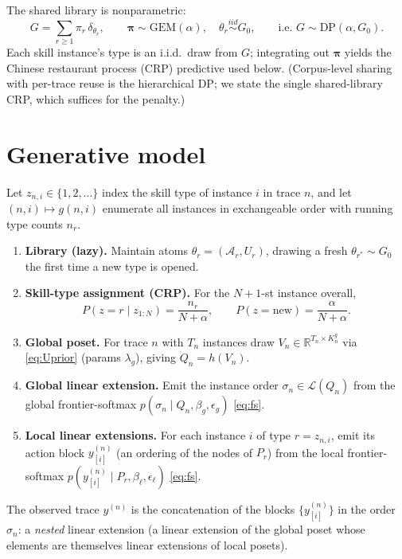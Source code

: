\documentclass[11pt]{article}
\newcommand{\R}{\mathbb{R}}
\newcommand{\sA}{\mathcal{A}}
\newcommand{\sL}{\mathcal{L}}
\newcommand{\GEM}{\mathrm{GEM}}
\newcommand{\DP}{\mathrm{DP}}
\begin{document}
The shared library is nonparametric:
\begin{equation}
G=\sum_{r\ge1}\pi_r\,\delta_{\theta_r},\qquad
\bm\pi\sim\GEM(\alpha),\quad \theta_r\stackrel{iid}{\sim}G_0,\qquad\text{i.e. } G\sim\DP(\alpha,G_0).
\label{eq:DP}
\end{equation}
Each skill instance's type is an i.i.d.\ draw from $G$; integrating out $\bm\pi$ yields the Chinese
restaurant process (CRP) predictive used below. (Corpus-level sharing with per-trace reuse is the
hierarchical DP; we state the single shared-library CRP, which suffices for the penalty.)

\section{Generative model}
Let $z_{n,i}\in\{1,2,\dots\}$ index the skill type of instance $i$ in trace $n$, and let
$(n,i)\mapsto g(n,i)$ enumerate all instances in exchangeable order with running type counts $n_r$.
\begin{enumerate}
\item \textbf{Library (lazy).} Maintain atoms $\theta_r=(\sA_r,U_r)$, drawing a fresh
$\theta_{r^*}\sim G_0$ the first time a new type is opened.
\item \textbf{Skill-type assignment (CRP).} For the $N{+}1$-st instance overall,
\begin{equation}
P(z=r\mid z_{1:N})=\frac{n_r}{N+\alpha},\qquad
P(z=\text{new})=\frac{\alpha}{N+\alpha}.
\label{eq:crp}
\end{equation}
\item \textbf{Global poset.} For trace $n$ with $T_n$ instances draw $V_n\in\R^{T_n\times K^g_n}$ via
\eqref{eq:Uprior} (params $\lambda_g$), giving $Q_n=h(V_n)$.
\item \textbf{Global linear extension.} Emit the instance order $\sigma_n\in\sL(Q_n)$ from the global
frontier-softmax $p(\sigma_n\mid Q_n,\beta_g,\epsilon_g)$ \eqref{eq:fs}.
\item \textbf{Local linear extensions.} For each instance $i$ of type $r=z_{n,i}$, emit its action block
$y^{(n)}_{[i]}$ (an ordering of the nodes of $P_r$) from the local frontier-softmax
$p(y^{(n)}_{[i]}\mid P_r,\beta_\ell,\epsilon_\ell)$ \eqref{eq:fs}.
\end{enumerate}
The observed trace $y^{(n)}$ is the concatenation of the blocks $\{y^{(n)}_{[i]}\}$ in the order
$\sigma_n$: a \emph{nested} linear extension (a linear extension of the global poset whose elements are
themselves linear extensions of local posets).
\end{document}
